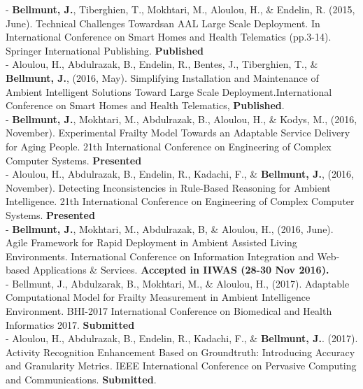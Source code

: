 \documentclass[paper=a4,fontsize=11pt]{temp} %
\begin{document}
%
\pagebreak
\sepspace

\hspace{3mm}
\begin{minipage}{0.04\linewidth}
        \hspace{\linewidth}
		\end{minipage}%
   \begin{minipage}{0.88\linewidth}
    
    - \textbf{Bellmunt, J.}, Tiberghien, T., Mokhtari, M., Aloulou, H., \& Endelin, R. (2015, June). Technical Challenges Towardsan AAL Large Scale Deployment. In International Conference on Smart Homes and Health Telematics (pp.3-14). Springer International Publishing. \textbf{Published}\\
    
    - Aloulou, H., Abdulrazak, B., Endelin, R., Bentes, J., Tiberghien, T., \& \textbf{Bellmunt, J.}, (2016, May). Simplifying Installation and Maintenance of Ambient Intelligent Solutions Toward Large Scale Deployment.International Conference on Smart Homes and Health Telematics, \textbf{Published}.\\
    
   - \textbf{Bellmunt, J.}, Mokhtari, M., Abdulrazak, B., Aloulou, H., \& Kodys, M., (2016, November). Experimental Frailty Model Towards an Adaptable Service Delivery for Aging People. 21th International Conference on Engineering of Complex Computer Systems. \textbf{Presented}\\
   
    - Aloulou, H., Abdulrazak, B., Endelin, R., Kadachi, F., \& \textbf{Bellmunt, J.}, (2016, November). Detecting Inconsistencies in Rule-Based Reasoning for Ambient Intelligence. 21th International Conference on Engineering of Complex Computer Systems. \textbf{Presented}\\
    
    - \textbf{Bellmunt, J.}, Mokhtari, M., Abdulrazak, B, \& Aloulou, H., (2016, June). Agile Framework for Rapid Deployment in Ambient Assisted Living Environments. International Conference on Information Integration and Web-based Applications \& Services. \textbf{Accepted in IIWAS (28-30 Nov 2016).}\\
    
    - Bellmunt, J., Abdulzarak, B., Mokhtari, M., \& Aloulou, H., (2017). Adaptable Computational Model for Frailty Measurement in Ambient Intelligence Environment. BHI-2017 International Conference on Biomedical and Health Informatics 2017. \textbf{Submitted}\\
    
    - Aloulou, H., Abdulrazak, B., Endelin, R., Kadachi, F., \& \textbf{Bellmunt, J.}. (2017). Activity Recognition Enhancement Based on Groundtruth: Introducing Accuracy and Granularity Metrics. IEEE
International Conference on Pervasive Computing and Communications. \textbf{Submitted}.\\

   \end{minipage}        
\sepspace
\end{document}
